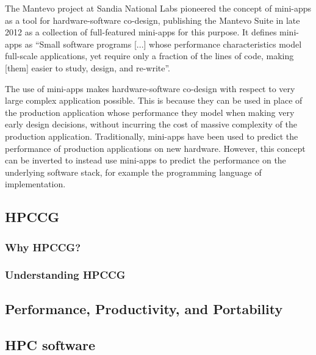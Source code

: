 The Mantevo project at Sandia National Labs pioneered the concept of mini-apps as a tool for hardware-software co-design, publishing the Mantevo Suite in late 2012 as a collection of full-featured mini-apps for this purpose. It defines mini-apps as ``Small software programs [...] whose performance characteristics model full-scale applications, yet require only a fraction of the lines of code, making [them] easier to study, design, and re-write''.

The use of mini-apps makes hardware-software co-design with respect to very large complex application possible. This is because they can be used in place of the production application whose performance they model when making very early design decisions, without incurring the cost of massive complexity of the production application. Traditionally, mini-apps have been used to predict the performance of production applications on new hardware. However, this concept can be inverted to instead use mini-apps to predict the performance on the underlying software stack, for example the programming language of implementation.



\subsection{HPCCG}
\label{ssec:hpccg} %


\subsubsection{Why HPCCG?}
\label{sssec:why-hpccg}

\subsubsection{Understanding HPCCG}
\label{sssec:understanding-hpccg}


\subsection{Performance, Productivity, and Portability}
\label{ssec:p3hpc} %



\subsection{HPC software}
\label{ssec:hpc-tools} %


